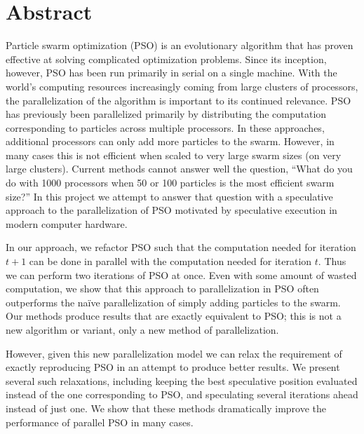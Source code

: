 \documentclass[ms]{byuprop}
\title{\Title}
\author{\Author}
\begin{document}
\maketitle



\section{Abstract}

Particle swarm optimization (PSO) is an evolutionary algorithm that has proven
effective at solving complicated optimization problems.  Since its inception,
however, PSO has been run primarily in serial on a single machine.  With the
world's computing resources increasingly coming from large clusters of
processors, the parallelization of the algorithm is important to its continued
relevance.  PSO has previously been parallelized primarily by distributing the
computation corresponding to particles across multiple processors.  In these
approaches, additional processors can only add more particles to the swarm.
However, in many cases this is not efficient when scaled to very large swarm
sizes (on very large clusters).  Current methods cannot answer well the
question, ``What do you do with 1000 processors when 50 or 100 particles is the
most efficient swarm size?''  In this project we attempt to answer that
question with a speculative approach to the parallelization of PSO motivated by
speculative execution in modern computer hardware.

In our approach, we refactor PSO such that the computation needed for iteration
$t+1$ can be done in parallel with the computation needed for iteration $t$.
Thus we can perform two iterations of PSO at once.  Even with some amount of
wasted computation, we show that this approach to parallelization in PSO often
outperforms the na\"ive parallelization of simply adding particles to the
swarm.  Our methods produce results that are exactly equivalent to PSO; this is
not a new algorithm or variant, only a new method of parallelization.

However, given this new parallelization model we can relax the requirement of
exactly reproducing PSO in an attempt to produce better results.  We present
several such relaxations, including keeping the best speculative position
evaluated instead of the one corresponding to PSO, and speculating several
iterations ahead instead of just one.  We show that these methods dramatically
improve the performance of parallel PSO in many cases.
\end{document}
